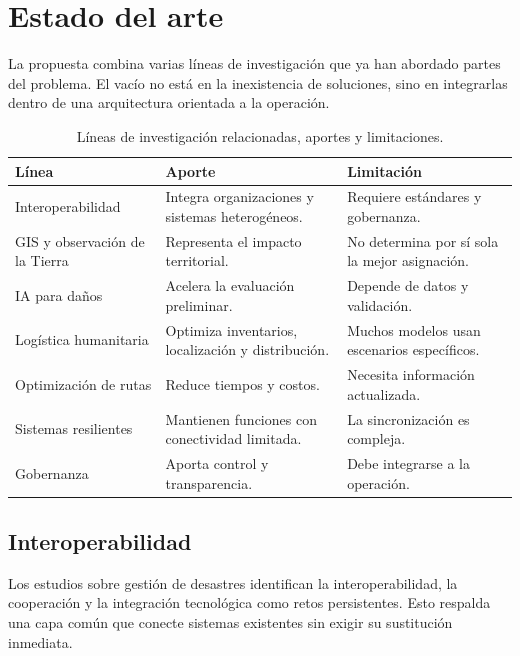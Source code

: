 \documentclass[11pt,a4paper]{article}
\begin{document}
\section{Estado del arte}

La propuesta combina varias líneas de investigación que ya han abordado partes
del problema. El vacío no está en la inexistencia de soluciones, sino en
integrarlas dentro de una arquitectura orientada a la operación.

\begin{table}[htbp]
\centering
\caption{Líneas de investigación relacionadas, aportes y limitaciones.}
\label{tab:estado-arte}
\begin{tabularx}{\textwidth}{@{}p{3.4cm}LL@{}}
\toprule
\textbf{Línea} & \textbf{Aporte} & \textbf{Limitación} \\
\midrule
Interoperabilidad & Integra organizaciones y sistemas heterogéneos. &
Requiere estándares y gobernanza. \\
\addlinespace
GIS y observación de la Tierra & Representa el impacto territorial. &
No determina por sí sola la mejor asignación. \\
\addlinespace
IA para daños & Acelera la evaluación preliminar. &
Depende de datos y validación. \\
\addlinespace
Logística humanitaria & Optimiza inventarios, localización y distribución. &
Muchos modelos usan escenarios específicos. \\
\addlinespace
Optimización de rutas & Reduce tiempos y costos. &
Necesita información actualizada. \\
\addlinespace
Sistemas resilientes & Mantienen funciones con conectividad limitada. &
La sincronización es compleja. \\
\addlinespace
Gobernanza & Aporta control y transparencia. &
Debe integrarse a la operación. \\
\bottomrule
\end{tabularx}
\end{table}

\subsection{Interoperabilidad}

Los estudios sobre gestión de desastres identifican la interoperabilidad, la
cooperación y la integración tecnológica como retos persistentes. Esto
respalda una capa común que conecte sistemas existentes sin exigir su
sustitución inmediata.
\end{document}
